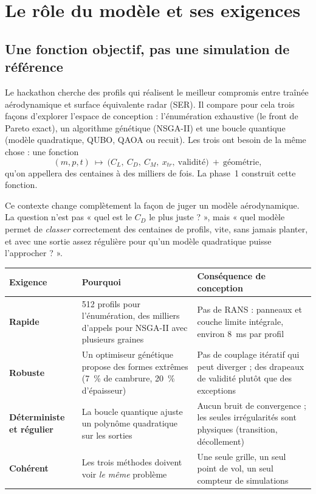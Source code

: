 \chapter{Le rôle du modèle et ses exigences}\label{ch:intro}

\section{Une fonction objectif, pas une simulation de référence}
Le hackathon cherche des profils qui réalisent le meilleur compromis entre traînée aérodynamique et surface équivalente radar (SER). Il compare pour cela trois façons d'explorer l'espace de conception : l'énumération exhaustive (le front de Pareto exact), un algorithme génétique (NSGA-II) et une boucle quantique (modèle quadratique, QUBO, QAOA ou recuit). Les trois ont besoin de la même chose : une fonction
\[
(m,p,t)\ \longmapsto\ \big(C_L,\ C_D,\ C_M,\ x_{tr},\ \text{validité}\big)\ +\ \text{géométrie},
\]
qu'on appellera des centaines à des milliers de fois. La phase~1 construit cette fonction.

Ce contexte change complètement la façon de juger un modèle aérodynamique. La question n'est pas « quel est le $C_D$ le plus juste ? », mais « quel modèle permet de \emph{classer} correctement des centaines de profils, vite, sans jamais planter, et avec une sortie assez régulière pour qu'un modèle quadratique puisse l'approcher ? ».

\begin{center}
\renewcommand{\arraystretch}{1.2}
\begin{tabularx}{\linewidth}{lXX}
\toprule
Exigence & Pourquoi & Conséquence de conception \\
\midrule
\textbf{Rapide} & 512 profils pour l'énumération, des milliers d'appels pour NSGA-II avec plusieurs graines & Pas de RANS : panneaux et couche limite intégrale, environ 8~ms par profil \\
\textbf{Robuste} & Un optimiseur génétique propose des formes extrêmes (7~\% de cambrure, 20~\% d'épaisseur) & Pas de couplage itératif qui peut diverger ; des drapeaux de validité plutôt que des exceptions \\
\textbf{Déterministe et régulier} & La boucle quantique ajuste un polynôme quadratique sur les sorties & Aucun bruit de convergence ; les seules irrégularités sont physiques (transition, décollement) \\
\textbf{Cohérent} & Les trois méthodes doivent voir \emph{le même} problème & Une seule grille, un seul point de vol, un seul compteur de simulations \\
\bottomrule
\end{tabularx}
\end{center}

